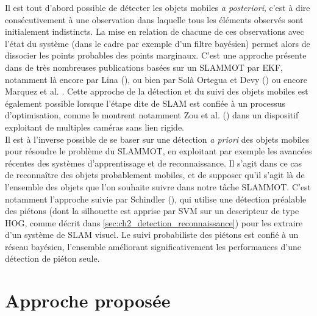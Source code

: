 Il est tout d'abord possible de détecter les objets mobiles \emph{a posteriori}, c'est à dire consécutivement à une observation dans laquelle tous les éléments observés sont initialement indistincts. La mise en relation de chacune de ces observations avec l'état du système (dans le cadre par exemple d'un filtre bayésien) permet alors de dissocier les points probables des points marginaux. C'est une approche présente dans de très nombreuses publications basées sur un SLAMMOT par EKF, notamment là encore par Lina (\cite{Lina}), ou bien par  Solà Ortegua et Devy (\cite{Ortega2007}) ou encore Marquez et al. \cite{Marquez2012}. Cette approche de la détection et du suivi des objets mobiles est également possible lorsque l'étape dite de \og SLAM\fg{} est confiée à un processus d'optimisation, comme le montrent notamment Zou et al. (\cite{Zou}) dans un dispositif exploitant de multiples caméras sans lien rigide. \\

Il est à l'inverse possible de se baser sur une détection \emph{a priori} des objets mobiles pour résoudre le problème du SLAMMOT, en exploitant par exemple les avancées récentes des systèmes d'apprentissage et de reconnaissance. Il s'agit dans ce cas de reconnaître des objets probablement mobiles, et de supposer qu'il s'agit là de l'ensemble des objets que l'on souhaite suivre dans notre tâche SLAMMOT. C'est notamment l'approche suivie par Schindler (\cite{Schindler2010}), qui utilise une détection préalable des piétons (dont la silhouette est apprise par SVM sur un descripteur de type HOG, comme décrit dans \ref{sec:ch2_detection_reconnaissance}) pour les extraire d'un système de SLAM visuel. Le suivi probabiliste des piétons est confié à un réseau bayésien, l'ensemble améliorant significativement les performances d'une détection de piéton seule.

\section{Approche proposée} \label{sec:ch2_Approche_globale}
